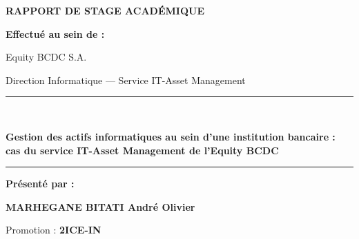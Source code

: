 \documentclass[12pt,a4paper]{report}
\begin{document}
\begin{titlepage}
    \vspace{1.1cm}
    
    {\fontsize{18}{22}\selectfont\bfseries RAPPORT DE STAGE ACADÉMIQUE\par}
    
    \vspace{0.8cm}
    
    {\large\bfseries Effectué au sein de :\par}
    \vspace{0.2cm}
    {\large Equity BCDC S.A. \par}
    {\large Direction Informatique — Service IT-Asset Management\par}
    
    \vfill
    
    \begin{center}
        \rule{0.88\textwidth}{0.6pt}\\[0.5cm]
        
        \begin{minipage}{0.9\textwidth}
            \centering
            {\Large\bfseries
            Gestion des actifs informatiques au sein d'une institution bancaire :\\
            cas du service IT-Asset Management de l'Equity BCDC
            \par}
        \end{minipage}
        
        \vspace{0.5cm}
        \rule{0.88\textwidth}{0.6pt}
    \end{center}
    
    \vfill
    
    \begin{flushleft}
        {\bfseries Présenté par :\par}
        \textbf{MARHEGANE BITATI André Olivier}
        
        \vspace{0.4cm}
        
        Promotion : \textbf{2ICE-IN}\\
            
        \vspace{0.8cm}
        

\end{flushleft}
\end{titlepage}
\end{document}
